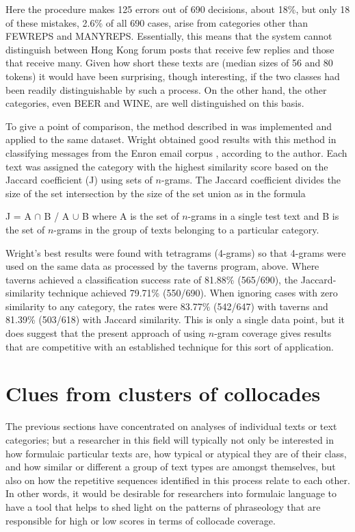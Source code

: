 \documentclass[output=paper]{langscibook}
\begin{document}
Here the procedure makes 125 errors out of 690 decisions, about 18\%, but only 18 of these mistakes, 2.6\% of all 690 cases, arise from categories other than FEWREPS and MANYREPS. Essentially, this means that the system cannot distinguish between Hong Kong forum posts that receive few replies and those that receive many. Given how short these texts are (median sizes of 56 and 80 tokens) it would have been surprising, though interesting, if the two classes had been readily distinguishable by such a process. On the other hand, the other categories, even BEER and WINE, are well distinguished on this basis.
\newpage

To give a point of comparison, the method described in \citet{Wright2017} was implemented and applied to the same dataset. Wright obtained good results with this method in classifying messages from the Enron email corpus \citep{Cohen2009}, according to the author. Each text was assigned the category with the highest similarity score based on the Jaccard coefficient (J) using sets of $n$-grams. The Jaccard coefficient divides the size of the set intersection by the size of the set union as in the formula

\ea
  J = {\textbar}A ${\cap}$ B{\textbar} / {\textbar}A ${\cup}$ B{\textbar}
\z
where A is the set of $n$-grams in a single test text and B is the set of $n$-grams in the group of texts belonging to a particular category.

Wright's best results were found with tetragrams (4-grams) so that 4-grams were used on the same data as processed by the taverns program, above. Where taverns achieved a classification success rate of 81.88\% (565/690), the Jaccard-similarity technique achieved 79.71\% (550/690). When ignoring cases with zero similarity to any category, the rates were 83.77\% (542/647) with taverns and 81.39\% (503/618) with Jaccard similarity. This is only a single data point, but it does suggest that the present approach of using $n$-gram coverage gives results that are competitive with an established technique for this sort of application.

\section{Clues from clusters of collocades}\label{sec:forsyth:7}

The previous sections have concentrated on analyses of individual texts or text categories; but a researcher in this field will typically not only be interested in how formulaic particular texts are, how typical or atypical they are of their class, and how similar or different a group of text types are amongst themselves, but also on how the repetitive sequences identified in this process relate to each other. In other words, it would be desirable for researchers into formulaic language to have a tool that helps to shed light on the patterns of phraseology that are responsible for high or low scores in terms of collocade coverage.
\end{document}
